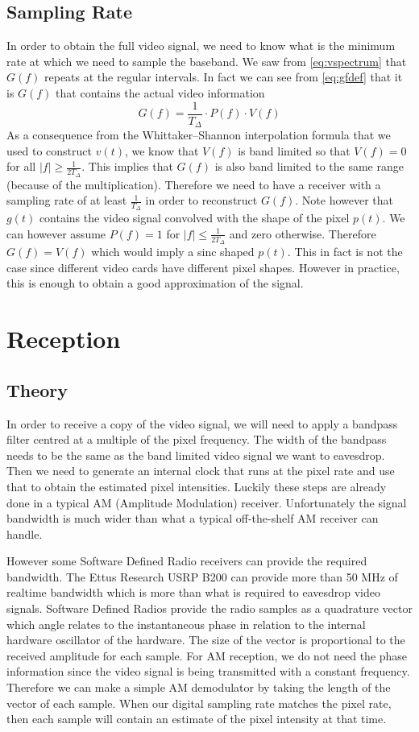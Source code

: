 \documentclass[a4paper,12pt,twoside,openright]{report}
\begin{document}
\subsection{Sampling Rate}

In order to obtain the full video signal, we need to know what is the minimum rate at which we need to sample the baseband. We saw from \ref{eq:vspectrum} that $G(f)$ repeats at the regular intervals. In fact we can see from \ref{eq:gfdef} that it is $G(f)$ that contains the actual video information
$$G(f) = \frac{1}{T_{\Delta}} \cdot P(f) \cdot V(f)$$
As a consequence from the Whittaker--Shannon interpolation formula that we used to construct $v(t)$, we know that $V(f)$ is band limited so that $V(f) = 0$ for all $|f| \geq \frac{1}{2 T_{\Delta}}$. This implies that $G(f)$ is also band limited to the same range (because of the multiplication). Therefore we need to have a receiver with a sampling rate of at least $\frac{1}{T_{\Delta}}$ in order to reconstruct $G(f)$. Note however that $g(t)$ contains the video signal convolved with the shape of the pixel $p(t)$. We can however assume $P(f)=1$ for $|f| \le \frac{1}{2 T_{\Delta}}$ and zero otherwise. Therefore $G(f) = V(f)$ which would imply a sinc shaped $p(t)$. This in fact is not the case since different video cards have different pixel shapes\cite{kuhn2003compromising}. However in practice, this is enough to obtain a good approximation of the signal.

\section{Reception}

\subsection{Theory}
In order to receive a copy of the video signal, we will need to apply a bandpass filter centred at a multiple of the pixel frequency. The width of the bandpass needs to be the same as the band limited video signal we want to eavesdrop. Then we need to generate an internal clock that runs at the pixel rate and use that to obtain the estimated pixel intensities. Luckily these steps are already done in a typical AM (Amplitude Modulation) receiver. Unfortunately the signal bandwidth is much wider than what a typical off-the-shelf AM receiver can handle.

However some Software Defined Radio receivers can provide the required bandwidth. The Ettus Research USRP B200 can provide more than 50 MHz of realtime bandwidth which is more than what is required to eavesdrop video signals. Software Defined Radios provide the radio samples as a quadrature vector which angle relates to the instantaneous phase in relation to the internal hardware oscillator of the hardware. The size of the vector is proportional to the received amplitude for each sample. For AM reception, we do not need the phase information since the video signal is being transmitted with a constant frequency. Therefore we can make a simple AM demodulator by taking the length of the vector of each sample. When our digital sampling rate matches the pixel rate, then each sample will contain an estimate of the pixel intensity at that time.
\end{document}
